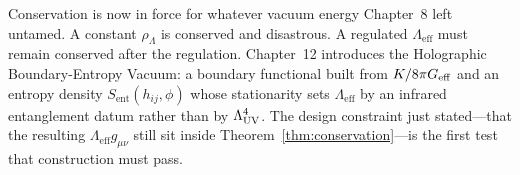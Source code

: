 Conservation is now in force for whatever vacuum energy Chapter~8
left untamed. A constant \(\rho_\Lambda\) is conserved and
disastrous. A regulated \(\Lambda_{\mathrm{eff}}\) must remain
conserved after the regulation. Chapter~12 introduces the
Holographic Boundary-Entropy Vacuum: a boundary functional built
from \(K/8\pi G_{\mathrm{eff}}\) and an entropy density
\(S_{\mathrm{ent}}(h_{ij},\phi)\) whose stationarity sets
\(\Lambda_{\mathrm{eff}}\) by an infrared entanglement datum
rather than by \(\Lambda_{\mathrm{UV}}^4\). The design constraint just stated---that
the resulting \(\Lambda_{\mathrm{eff}}g_{\mu\nu}\) still sit
inside Theorem~\ref{thm:conservation}---is the first test that
construction must pass.